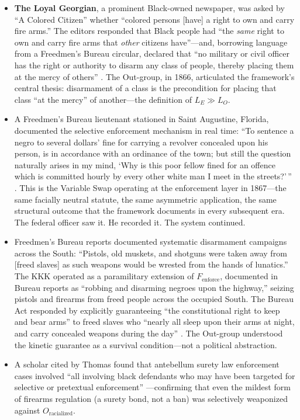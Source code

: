 \begin{itemize}
    \item \textbf{The Loyal Georgian}, a prominent Black-owned newspaper, was asked by ``A Colored Citizen'' whether ``colored persons [have] a right to own and carry fire arms.'' The editors responded that Black people had ``the \textit{same} right to own and carry fire arms that \textit{other} citizens have''---and, borrowing language from a Freedmen's Bureau circular, declared that ``no military or civil officer has the right or authority to disarm any class of people, thereby placing them at the mercy of others'' \cite{bruen}. The Out-group, in 1866, articulated the framework's central thesis: disarmament of a class is the precondition for placing that class ``at the mercy'' of another---the definition of $L_E \gg L_O$.

    \item A Freedmen's Bureau lieutenant stationed in Saint Augustine, Florida, documented the selective enforcement mechanism in real time: ``To sentence a negro to several dollars' fine for carrying a revolver concealed upon his person, is in accordance with an ordinance of the town; but still the question naturally arises in my mind, `Why is this poor fellow fined for an offence which is committed hourly by every other white man I meet in the streets?'\,'' \cite{bruen}. This is the Variable Swap operating at the enforcement layer in 1867---the same facially neutral statute, the same asymmetric application, the same structural outcome that the framework documents in every subsequent era. The federal officer saw it. He recorded it. The system continued.

    \item Freedmen's Bureau reports documented systematic disarmament campaigns across the South: ``Pistols, old muskets, and shotguns were taken away from [freed slaves] as such weapons would be wrested from the hands of lunatics.'' The KKK operated as a paramilitary extension of $F_{\text{enforce}}$, documented in Bureau reports as ``robbing and disarming negroes upon the highway,'' seizing pistols and firearms from freed people across the occupied South. The Bureau Act responded by explicitly guaranteeing ``the constitutional right to keep and bear arms'' to freed slaves who ``nearly all sleep upon their arms at night, and carry concealed weapons during the day'' \cite{bruen}. The Out-group understood the kinetic guarantee as a survival condition---not a political abstraction.

    \item A scholar cited by Thomas found that antebellum surety law enforcement cases involved ``all involving black defendants who may have been targeted for selective or pretextual enforcement'' \cite{bruen}---confirming that even the mildest form of firearms regulation (a surety bond, not a ban) was selectively weaponized against $O_{\text{racialized}}$.
\end{itemize}

